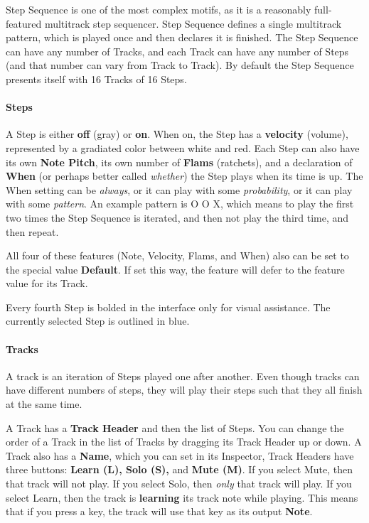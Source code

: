 \documentclass[twoside,10pt]{article}
\begin{document}
Step Sequence is one of the most complex motifs, as it is a reasonably full-featured multitrack step sequencer.  Step Sequence defines a single multitrack pattern, which is played once and then declares it is finished.  The Step Sequence can have any number of Tracks, and each Track can have any number of Steps (and that number can vary from Track to Track).  By default the Step Sequence presents itself with 16 Tracks of 16 Steps.  

\paragraph{Steps}

A Step is either {\bf off} (gray) or {\bf on}.  When on, the Step has a {\bf velocity} (volume), represented by a gradiated color between white and red.  Each Step can also have its own {\bf Note Pitch}, its own number of {\bf Flams} (ratchets), and a declaration of {\bf When} (or perhaps better called {\it whether}) the Step plays when its time is up.  The When setting can be {\it always}, or it can play with some {\it probability}, or it can play with some {\it pattern}.  An example pattern is \textsf{O O X}, which means to play the first two times the Step Sequence is iterated, and then not play the third time, and then repeat. 

All four of these features (Note, Velocity, Flams, and When) also can be set to the special value {\bf Default}.   If set this way, the feature will defer to the feature value for its Track.

Every fourth Step is bolded in the interface only for visual assistance.    The currently selected Step is outlined in blue.

\paragraph{Tracks}

A track is an iteration of Steps played one after another.  Even though tracks can have different numbers of steps, they will play their steps such that they all finish at the same time.

A Track has a {\bf Track Header} and then the list of Steps.  You can change the order of a Track in the list of Tracks by dragging its Track Header up or down.  A Track also has a {\bf Name}, which you can set in its Inspector,  Track Headers have three buttons: {\bf Learn (L), Solo (S),} and {\bf Mute (M)}.  If you select Mute, then that track will not play.  If you select Solo, then {\it only} that track will play.  If you select Learn, then the track is {\bf learning} its track note while playing.  This means that if you press a key, the track will use that key as its output {\bf Note}.     
\end{document}
